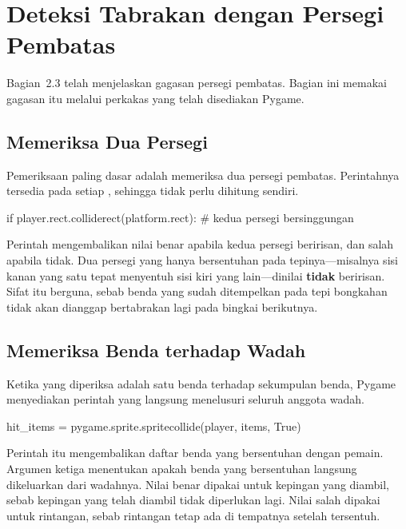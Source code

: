\section{Deteksi Tabrakan dengan Persegi Pembatas}
\label{sec:deteksi-tabrakan}

Bagian~2.3 telah menjelaskan gagasan persegi pembatas. Bagian ini memakai
gagasan itu melalui perkakas yang telah disediakan Pygame.

\subsection{Memeriksa Dua Persegi}

Pemeriksaan paling dasar adalah memeriksa dua persegi pembatas. Perintahnya
tersedia pada setiap , sehingga tidak perlu dihitung sendiri.

\begin{kodekeluaran}
if player.rect.colliderect(platform.rect):
    # kedua persegi bersinggungan
\end{kodekeluaran}

Perintah  mengembalikan nilai benar apabila kedua persegi
beririsan, dan salah apabila tidak. Dua persegi yang hanya
bersentuhan pada tepinya---misalnya sisi kanan yang satu tepat menyentuh sisi
kiri yang lain---dinilai \textbf{tidak} beririsan. Sifat itu berguna, sebab
benda yang sudah ditempelkan pada tepi bongkahan tidak akan dianggap
bertabrakan lagi pada bingkai berikutnya.

\subsection{Memeriksa Benda terhadap Wadah}

Ketika yang diperiksa adalah satu benda terhadap sekumpulan benda, Pygame
menyediakan perintah yang langsung menelusuri seluruh anggota wadah.

\begin{kodekeluaran}
hit_items = pygame.sprite.spritecollide(player, items, True)
\end{kodekeluaran}

Perintah itu mengembalikan daftar benda yang bersentuhan dengan pemain.
Argumen ketiga menentukan apakah benda yang bersentuhan langsung dikeluarkan
dari wadahnya. Nilai benar dipakai untuk kepingan yang diambil, sebab kepingan
yang telah diambil tidak diperlukan lagi. Nilai salah dipakai untuk rintangan,
sebab rintangan tetap ada di tempatnya setelah tersentuh.

